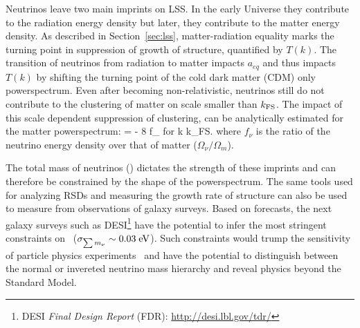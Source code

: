 Neutrinos leave two main imprints on LSS. In the early Universe they contribute
to the radiation energy density but later, they contribute to the matter energy 
density. As described in 
Section~\ref{sec:lss}, matter-radiation equality marks the turning point in 
suppression of growth of structure, quantified by $T(k)$. The transition of 
neutrinos from radiation to matter impacts $a_{eq}$ and thus impacts $T(k)$ by 
shifting the turning point of the cold dark matter (CDM) only powerspectrum. 
Even after becoming non-relativistic, neutrinos still do not contribute to the
clustering of matter on scale smaller than $k_{\rm FS}$. The impact of this scale dependent 
suppression of clustering, can be analytically estimated for the matter powerspectrum: 
\beq
{} =  \approx - 8 f_\nu \;\;\;\; {\rm for}\;\; k \gg k_{\rm FS}.
\eeq
where $f_\nu$ is the ratio of the neutrino energy density over that of matter 
($\Omega_\nu / \Omega_m$).

The total mass of neutrinos (\mneut) dictates the strength of these imprints and  
can therefore be constrained by the shape of the powerspectrum. The same tools 
used for analyzing RSDs and measuring the growth rate of structure can also be 
used to measure \mneut\; from observations of galaxy surveys.
Based on forecasts, the next galaxy surveys such as 
DESI\footnote{DESI \textit{Final Design Report} (FDR): \url{http://desi.lbl.gov/tdr/}} 
have the potential to infer the most stringent constraints on 
\mneut~($\sigma_{\sum m_\nu} \sim 0.03\;{\rm eV}$). Such constraints would 
trump the sensitivity of particle physics experiments~\citep[][]{Wolf_Katrin}
and have the potential to distinguish
between the normal or invereted neutrino mass hierarchy and reveal physics
beyond the Standard Model.

